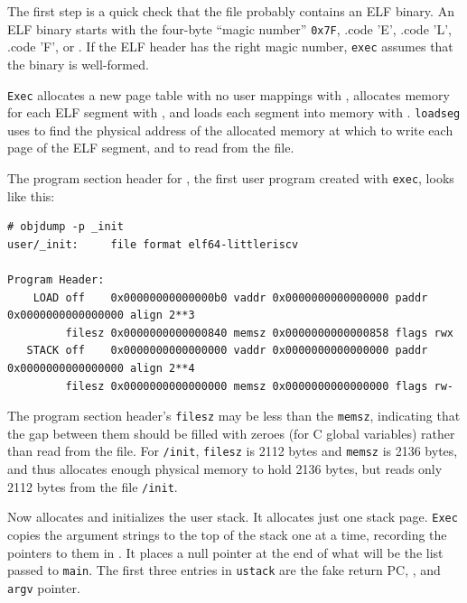 The first step is a quick check that the file probably contains an
ELF binary.
An ELF binary starts with the four-byte ``magic number''
\lstinline{0x7F},
.code 'E',
.code 'L',
.code 'F',
or
.
If the ELF header has the right magic number,
\lstinline{exec}
assumes that the binary is well-formed.

\lstinline{Exec}
allocates a new page table with no user mappings with
,
allocates memory for each ELF segment with
,
and loads each segment into memory with
.
\lstinline{loadseg}
uses
to find the physical address of the allocated memory at which to write
each page of the ELF segment, and
to read from the file.

The program section header for
,
the first user program created with
\lstinline{exec},
looks like this:
\begin{lstlisting}[]
# objdump -p _init
user/_init:     file format elf64-littleriscv

Program Header:
    LOAD off    0x00000000000000b0 vaddr 0x0000000000000000 paddr 0x0000000000000000 align 2**3
         filesz 0x0000000000000840 memsz 0x0000000000000858 flags rwx
   STACK off    0x0000000000000000 vaddr 0x0000000000000000 paddr 0x0000000000000000 align 2**4
         filesz 0x0000000000000000 memsz 0x0000000000000000 flags rw-
\end{lstlisting}

The program section header's
\lstinline{filesz}
may be less than the
\lstinline{memsz},
indicating that the gap between them should be filled
with zeroes (for C global variables) rather than read from the file.
For
\lstinline{/init},
\lstinline{filesz}
is 2112 bytes and
\lstinline{memsz}
is 2136 bytes,
and thus
allocates enough physical memory to hold 2136 bytes, but reads only 2112 bytes
from the file
\lstinline{/init}.

Now
allocates and initializes the user stack.
It allocates just one stack page.
\lstinline{Exec}
copies the argument strings to the top of the stack
one at a time, recording the pointers to them in
.
It places a null pointer at the end of what will be the
list passed to
\lstinline{main}.
The first three entries in
\lstinline{ustack}
are the fake return PC,
,
and
\lstinline{argv}
pointer.

